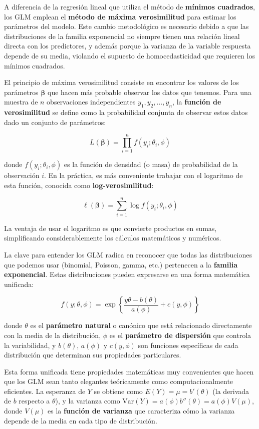 \documentclass[
  letterpaper,
  DIV=11,
  numbers=noendperiod]{scrreprt}
\begin{document}
A diferencia de la regresión lineal que utiliza el método de
\textbf{mínimos cuadrados}, los GLM emplean el \textbf{método de máxima
verosimilitud} para estimar los parámetros del modelo. Este cambio
metodológico es necesario debido a que las distribuciones de la familia
exponencial no siempre tienen una relación lineal directa con los
predictores, y además porque la varianza de la variable respuesta
depende de su media, violando el supuesto de homocedasticidad que
requieren los mínimos cuadrados.

El principio de máxima verosimilitud consiste en encontrar los valores
de los parámetros \(\boldsymbol{\beta}\) que hacen más probable observar
los datos que tenemos. Para una muestra de \(n\) observaciones
independientes \(y_1, y_2, \ldots, y_n\), la \textbf{función de
verosimilitud} se define como la probabilidad conjunta de observar estos
datos dado un conjunto de parámetros:

\[L(\boldsymbol{\beta}) = \prod_{i=1}^{n} f(y_i; \theta_i, \phi)\]

donde \(f(y_i; \theta_i, \phi)\) es la función de densidad (o masa) de
probabilidad de la observación \(i\). En la práctica, es más conveniente
trabajar con el logaritmo de esta función, conocida como
\textbf{log-verosimilitud}:

\[\ell(\boldsymbol{\beta}) = \sum_{i=1}^{n} \log f(y_i; \theta_i, \phi)\]

La ventaja de usar el logaritmo es que convierte productos en sumas,
simplificando considerablemente los cálculos matemáticos y numéricos.

La clave para entender los GLM radica en reconocer que todas las
distribuciones que podemos usar (binomial, Poisson, gamma, etc.)
pertenecen a la \textbf{familia exponencial}. Estas distribuciones
pueden expresarse en una forma matemática unificada:

\[f(y; \theta, \phi) = \exp\left\{\frac{y\theta - b(\theta)}{a(\phi)} + c(y, \phi)\right\}\]

donde \(\theta\) es el \textbf{parámetro natural} o canónico que está
relacionado directamente con la media de la distribución, \(\phi\) es el
\textbf{parámetro de dispersión} que controla la variabilidad, y
\(b(\theta)\), \(a(\phi)\) y \(c(y, \phi)\) son funciones específicas de
cada distribución que determinan sus propiedades particulares.

Esta forma unificada tiene propiedades matemáticas muy convenientes que
hacen que los GLM sean tanto elegantes teóricamente como
computacionalmente eficientes. La esperanza de \(Y\) se obtiene como
\(E(Y) = \mu = b'(\theta)\) (la derivada de \(b\) respecto a
\(\theta\)), y la varianza como
\(\text{Var}(Y) = a(\phi) b''(\theta) = a(\phi) V(\mu)\), donde
\(V(\mu)\) es la \textbf{función de varianza} que caracteriza cómo la
varianza depende de la media en cada tipo de distribución.
\end{document}
